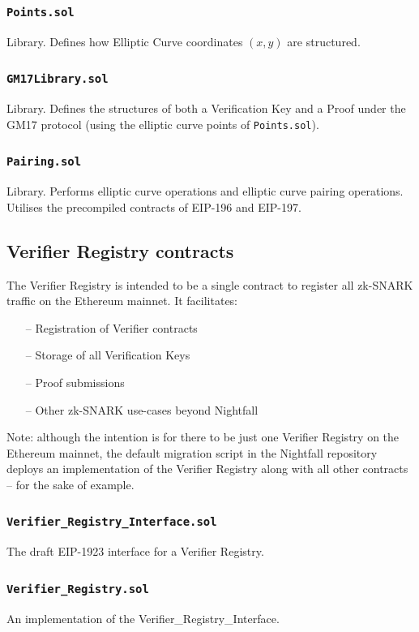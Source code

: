 \subsubsection{\texttt{Points.sol}}
Library. Defines how Elliptic Curve coordinates $(x, y)$ are structured.

\subsubsection{\texttt{GM17Library.sol}}
Library. Defines the structures of both a Verification Key and a Proof under the GM17 protocol (using the elliptic curve points of \texttt{Points.sol}).

\subsubsection{\texttt{Pairing.sol}}
Library. Performs elliptic curve operations and elliptic curve pairing operations. Utilises the precompiled contracts of EIP-196 and EIP-197.

\subsection{Verifier Registry contracts}
The Verifier Registry is intended to be a single contract to register all zk-SNARK traffic on the Ethereum mainnet. It facilitates:
\begin{itemize}
  \item[--] Registration of Verifier contracts 
  \item[--] Storage of all Verification Keys
  \item[--] Proof submissions 
  \item[--] Other zk-SNARK use-cases beyond Nightfall 
\end{itemize}

Note: although the intention is for there to be just one Verifier Registry on the Ethereum mainnet, the default migration script in the Nightfall repository deploys an implementation of the Verifier Registry along with all other contracts -- for the sake of example.

\subsubsection{\texttt{Verifier\_Registry\_Interface.sol}}
The draft EIP-1923 interface for a Verifier Registry.

\subsubsection{\texttt{Verifier\_Registry.sol}}
An implementation of the Verifier\_Registry\_Interface.

